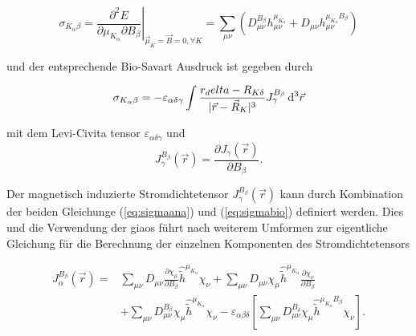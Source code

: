     \begin{equation}\label{eq:sigmaana}
    \sigma_{K_\alpha\beta}=\left.\frac{\partial^2 E}{\partial \mu_{K_\alpha}\partial B_\beta}\right|_{\vec{\mu}_K=\vec{B}=0,\forall K}=\sum_{\mu\nu}\left(D_{\mu\nu}^{B_\beta}h_{\mu\nu}^{\mu_{K_\alpha}}+D_{\mu\nu}h_{\mu\nu}^{\mu_{K_\alpha}B_\beta}\right) 
    \end{equation}
    
und der entsprechende Bio-Savart Ausdruck ist gegeben durch

	\begin{equation}\label{eq:sigmabio}
	\sigma_{K_\alpha\beta}=-\varepsilon_{\alpha\delta\gamma}\int\frac{r_delta-R_{K\delta}}{\vert\vec{r}-\vec{R}_K\vert^3}J^{B_\beta}_\gamma\mathop{}\!\mathrm{d^3}\vec{r}
	\end{equation}
	
	mit dem Levi-Civita tensor $\varepsilon_{\alpha\delta\gamma}$ und 
	\begin{equation}
	J^{B_\beta}_\gamma(\vec{r})=\frac{\partial J_\gamma(\vec{r})}{\partial B_\beta}.
	\end{equation}
	
	Der magnetisch induzierte Stromdichtetensor $J^{B_\beta}_\gamma(\vec{r})$ kann durch Kombination der beiden Gleichunge (\ref{eq:sigmaana}) und (\ref{eq:sigmabio}) definiert werden. Dies und die Verwendung der \acp{giao} führt nach weiterem Umformen zur eigentliche Gleichung für die Berechnung der einzelnen Komponenten des Stromdichtetensors\supercite{juselius2004calculation}
	
	\begin{equation}\label{eq:stromdichte}
	\begin{aligned}
	J^{B_\beta}_\alpha(\vec{r})=&\sum_{\mu\nu} D_{\mu\nu}\frac{\partial\chi_\mu}{\partial B_\beta}\hat{\tilde{h}}^{\mu_{K_\alpha}}\chi_\nu
	+\sum_{\mu\nu} D_{\mu\nu}\chi_\mu\hat{\tilde{h}}^{\mu_{K_\alpha}}\frac{\partial\chi_\nu}{\partial B_\beta}\\
	&+\sum_{\mu\nu} D_{\mu\nu}^{B_\beta}\chi_\mu\hat{\tilde{h}}^{\mu_{K_\alpha}}\chi_\nu
	-\varepsilon_{\alpha\beta\delta}\left[\sum_{\mu\nu} D_{\mu\nu}^{B_\delta}\chi_\mu\hat{\tilde{h}}^{\mu_{K_\alpha}B_\beta}\chi_\nu\right].
	\end{aligned}
	\end{equation}
	
